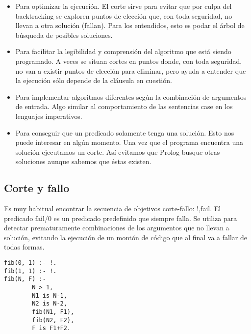 \documentclass[11pt]{article}
\begin{document}
\begin{itemize}
\item Para optimizar la ejecución. El corte sirve para evitar que por
culpa del backtracking se exploren puntos de elección que, con toda
seguridad, no llevan a otra solución (fallan). Para los entendidos,
esto es podar el árbol de búsqueda de posibles soluciones.
\item Para facilitar la legibilidad y comprensión del algoritmo que está
siendo programado. A veces se situan cortes en puntos donde, con
toda seguridad, no van a existir puntos de elección para eliminar,
pero ayuda a entender que la ejecución sólo depende de la cláusula
en cuestión.
\item Para implementar algoritmos diferentes según la combinación de
argumentos de entrada. Algo similar al comportamiento de las
sentencias case en los lenguajes imperativos.
\item Para conseguir que un predicado solamente tenga una solución. Esto
nos puede interesar en algún momento. Una vez que el programa
encuentra una solución ejecutamos un corte. Así evitamos que Prolog
busque otras soluciones aunque sabemos que éstas existen.
\end{itemize}

\subsection*{Corte y fallo}
\label{sec:orga58f9c5}
Es muy habitual encontrar la secuencia de objetivos corte-fallo:
!,fail. El predicado fail/0 es un predicado predefinido que siempre
falla. Se utiliza para detectar prematuramente combinaciones de los
argumentos que no llevan a solución, evitando la ejecución de un
montón de código que al final va a fallar de todas formas.

\begin{verbatim}
fib(0, 1) :- !.
fib(1, 1) :- !.
fib(N, F) :-
        N > 1,
        N1 is N-1,
        N2 is N-2,
        fib(N1, F1),
        fib(N2, F2),
        F is F1+F2.
\end{verbatim}
\end{document}
